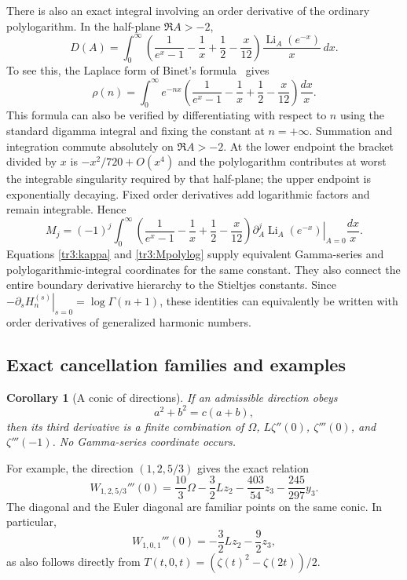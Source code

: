 \documentclass[11pt]{article}
\numberwithin{equation}{section}
\theoremstyle{plain}
\newtheorem{corollary}[theorem]{Corollary}
\theoremstyle{definition}
\theoremstyle{remark}
\begin{document}
There is also an exact integral involving an order derivative of the
ordinary polylogarithm.  In the half-plane $\Re A>-2$,
\begin{equation}\label{tr3:Dpolylog}
 D(A)=\int_0^\infty
 \left(\frac1{e^x-1}-\frac1x+\frac12-\frac{x}{12}\right)
           \frac{\operatorname{Li}_A(e^{-x})}{x}\,dx.
\end{equation}
To see this, the Laplace form of Binet's formula~\cite[\S5.9]{tr3:DLMF} gives
\[
 \rho(n)=\int_0^\infty e^{-nx}
 \left(\frac1{e^x-1}-\frac1x+\frac12-\frac{x}{12}\right)\frac{dx}{x}.
\]
This formula can also be verified by differentiating with respect to
$n$ using the standard digamma integral and fixing the constant at
$n=+\infty$.  Summation and integration commute absolutely on
$\Re A>-2$.  At the lower endpoint the bracket divided by $x$ is
$-x^2/720+O(x^4)$ and the polylogarithm contributes at worst the
integrable singularity required by that half-plane; the upper endpoint
is exponentially decaying.  Fixed order derivatives add logarithmic
factors and remain integrable.  Hence
\begin{equation}\label{tr3:Mpolylog}
 M_j=(-1)^j\int_0^\infty
 \left(\frac1{e^x-1}-\frac1x+\frac12-\frac{x}{12}\right)
 \left.\partial_A^j\operatorname{Li}_A(e^{-x})\right|_{A=0}\frac{dx}{x}.
\end{equation}
Equations \eqref{tr3:kappa} and \eqref{tr3:Mpolylog} supply equivalent
Gamma-series and polylogarithmic-integral coordinates for the same
constant.  They also connect the entire boundary derivative hierarchy
to the Stieltjes constants.  Since
$-\left.\partial_s H_n^{(s)}\right|_{s=0}=\log\Gamma(n+1)$,
these identities can equivalently be written with order derivatives of
generalized harmonic numbers.

\subsection{Exact cancellation families and examples}

\begin{corollary}[A conic of directions]\label{tr3:conic}
If an admissible direction obeys
\begin{equation}\label{tr3:coniceq}
 a^2+b^2=c(a+b),
\end{equation}
then its third derivative is a finite combination of
$\Omega$, $L\zeta''(0)$, $\zeta'''(0)$, and $\zeta'''(-1)$.
No Gamma-series coordinate occurs.
\end{corollary}

For example, the direction $(1,2,5/3)$ gives the exact relation
\begin{equation}\label{tr3:conicexample}
 W_{1,2,5/3}'''(0)=\frac{10}{3}\Omega
 -\frac32Lz_2-\frac{403}{54}z_3-\frac{245}{297}y_3.
\end{equation}
The diagonal and the Euler diagonal are familiar points on the same
conic.  In particular,
\[
 W_{1,0,1}'''(0)=-\frac32Lz_2-\frac92z_3,
\]
as also follows directly from
$T(t,0,t)=(\zeta(t)^2-\zeta(2t))/2$.
\end{document}
